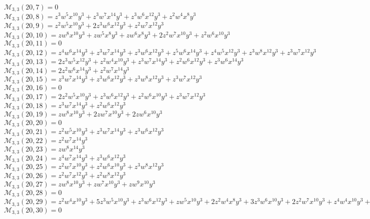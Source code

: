 \documentclass[12pt]{memoireuqam1.3}
\begin{document}
$\mathcal{M}_{3,3}(20,7)=0$\\
$\mathcal{M}_{3,3}(20,8)=z^3w^5x^{10}y^3+z^3w^7x^{14}y^3+z^3w^6x^{12}y^3+z^2w^4x^8y^3$\\
$\mathcal{M}_{3,3}(20,9)=z^2w^5x^{10}y^3+2z^3w^6x^{12}y^3+z^2w^7x^{12}y^3$\\
$\mathcal{M}_{3,3}(20,10)=zw^8x^{10}y^3+zw^5x^8y^3+zw^6x^8y^3+2z^2w^7x^{10}y^3+z^2w^6x^{10}y^3$\\
$\mathcal{M}_{3,3}(20,11)=0$\\
$\mathcal{M}_{3,3}(20,12)=z^4w^6x^{14}y^3+z^3w^7x^{14}y^3+z^3w^6x^{12}y^3+z^5w^6x^{14}y^3+z^4w^5x^{12}y^3+z^3w^8x^{12}y^3+z^3w^7x^{12}y^3$\\
$\mathcal{M}_{3,3}(20,13)=2z^3w^5x^{12}y^3+z^2w^4x^{10}y^3+z^3w^7x^{14}y^3+z^2w^6x^{12}y^3+z^3w^6x^{14}y^3$\\
$\mathcal{M}_{3,3}(20,14)=2z^2w^6x^{14}y^3+z^2w^7x^{14}y^3$\\
$\mathcal{M}_{3,3}(20,15)=z^3w^7x^{14}y^3+z^3w^6x^{12}y^3+z^3w^8x^{12}y^3+z^3w^7x^{12}y^3$\\
$\mathcal{M}_{3,3}(20,16)=0$\\
$\mathcal{M}_{3,3}(20,17)=2z^2w^5x^{10}y^3+z^3w^6x^{12}y^3+z^2w^6x^{10}y^3+z^3w^7x^{12}y^3$\\
$\mathcal{M}_{3,3}(20,18)=z^3w^7x^{14}y^3+z^2w^6x^{12}y^3$\\
$\mathcal{M}_{3,3}(20,19)=zw^8x^{10}y^3+2zw^7x^{10}y^3+2zw^6x^{10}y^3$\\
$\mathcal{M}_{3,3}(20,20)=0$\\
$\mathcal{M}_{3,3}(20,21)=z^2w^5x^{10}y^3+z^3w^7x^{14}y^3+z^3w^6x^{12}y^3$\\
$\mathcal{M}_{3,3}(20,22)=z^2w^7x^{14}y^3$\\
$\mathcal{M}_{3,3}(20,23)=zw^8x^{14}y^3$\\
$\mathcal{M}_{3,3}(20,24)=z^4w^7x^{14}y^3+z^3w^6x^{12}y^3$\\
$\mathcal{M}_{3,3}(20,25)=z^2w^7x^{10}y^3+z^2w^6x^{10}y^3+z^3w^8x^{12}y^3$\\
$\mathcal{M}_{3,3}(20,26)=z^2w^7x^{12}y^3+z^2w^8x^{12}y^3$\\
$\mathcal{M}_{3,3}(20,27)=zw^8x^{10}y^3+zw^7x^{10}y^3+zw^9x^{10}y^3$\\
$\mathcal{M}_{3,3}(20,28)=0$\\
$\mathcal{M}_{3,3}(20,29)=z^2w^4x^{10}y^3+5z^3w^5x^{10}y^3+z^3w^6x^{12}y^3+zw^5x^{10}y^3+2z^2w^4x^8y^3+3z^3w^6x^{10}y^3+2z^2w^7x^{10}y^3+z^4w^4x^{10}y^3+z^2w^5x^8y^3$\\
$\mathcal{M}_{3,3}(20,30)=0$\\
\end{document}
